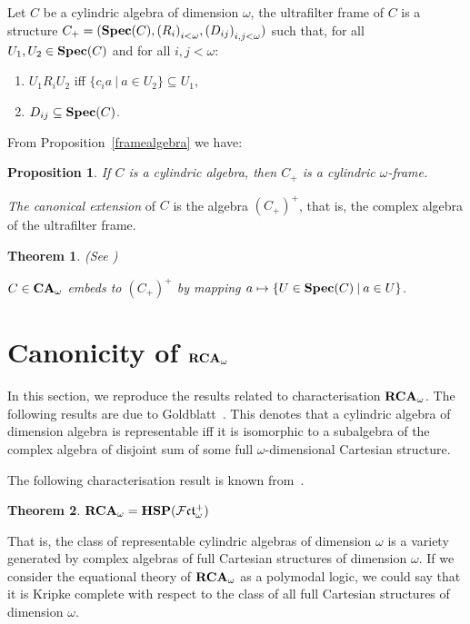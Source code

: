 \documentclass{article}
\theoremstyle{defin}
\theoremstyle{theorem}
\newtheorem{theorem}{Theorem}
\theoremstyle{claim}
\theoremstyle{prop}
\newtheorem{prop}{Proposition}
\theoremstyle{lemma}
\theoremstyle{fact}
\theoremstyle{remark}
\theoremstyle{ex}
\theoremstyle{col}
\theoremstyle{question}
\begin{document}
Let $C$ be a cylindric algebra of dimension $\omega$, the ultrafilter frame of $C$ is a structure 
$C_+ = ({\bf Spec}(C), {(R_i)}_{i < \omega}, {(D_{ij})}_{i, j < \omega})$ such that, 
for all $U_1, U_2 \in {\bf Spec}(C)$ and for all $i, j < \omega$:
\begin{enumerate}
\item $U_1 R_i U_2$ iff $\{ c_i a \: | \: a \in U_2 \} \subseteq U_1$,
\item $D_{ij} \subseteq {\bf Spec}(C)$.
\end{enumerate}

From Proposition~\ref{framealgebra} we have:
\begin{prop}
If $C$ is a cylindric algebra, then $C_+$ is a cylindric $\omega$-frame.
\end{prop}

\emph{The canonical extension} of $C$ is the algebra ${(C_+)}^+$, that is, the complex algebra of the ultrafilter frame.

\begin{theorem} (See \cite{jonsson1951boolean})

$C \in {\bf CA}_{\omega}$ embeds to ${(C_+)}^+$ by mapping 
$a \mapsto \{ U \in {\bf Spec}(C) \: | \: a \in U \}$.
\end{theorem}

\section{Canonicity of ${\bf RCA}_{\omega}$}

In this section, we reproduce the results related to characterisation ${\bf RCA}_{\omega}$. 
The following results are due to Goldblatt~\cite{goldblatt1995elementary}. 
This denotes that a cylindric algebra of dimension algebra is representable iff 
it is isomorphic to a subalgebra of the complex algebra of disjoint sum of some full 
$\omega$-dimensional Cartesian structure.

\vspace{\baselineskip}

The following characterisation result is known from~\cite[Theorem 2.2.3]{Venema2013}.

\begin{theorem}
${\bf RCA}_{\omega} = {\bf HSP}(\mathcal{F}\mathfrak{ct}_{\omega}^{+})$
\end{theorem}

That is, the class of representable cylindric algebras of dimension $\omega$ is a variety generated by complex algebras of full Cartesian structures of dimension $\omega$. If we consider the equational theory of ${\bf RCA}_{\omega}$ as a polymodal logic, we could say that it is Kripke complete with respect to the class of all full Cartesian structures of dimension $\omega$.
\end{document}
